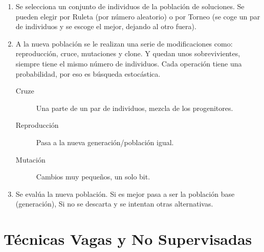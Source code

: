 \documentclass[12pt]{report} %
\begin{document}
\begin{enumerate}
  \item Se selecciona un conjunto de individuos de la población de soluciones. Se pueden elegir por Ruleta (por número aleatorio) o por Torneo (se coge un par de individuos y se escoge el mejor, dejando al otro fuera).
  \item A la nueva población se le realizan una serie de modificaciones como: reproducción, cruce, mutaciones y clone. Y quedan unos sobrevivientes, siempre tiene el mismo número de individuos.
  Cada operación tiene una probabilidad, por eso es búsqueda estocástica.
  \begin{description}
    \item[Cruze] Una parte de un par de individuos, mezcla de los progenitores.
    \item[Reproducción] Pasa a la nueva generación/población igual.
    \item[Mutación] Cambios muy pequeños, un solo bit.
  \end{description}
  \item Se evalúa la nueva población. Si es mejor pasa a ser la población base (generación), Si no se descarta y se intentan otras alternativas.
\end{enumerate}

\chapter{Técnicas Vagas y No Supervisadas}
\end{document}
